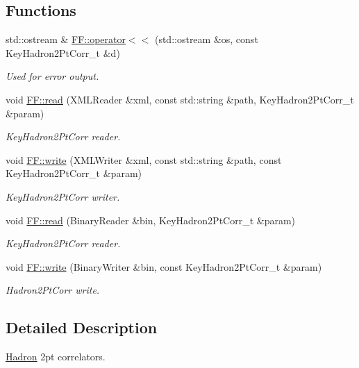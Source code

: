 \subsection*{Functions}
\begin{DoxyCompactItemize}
\item 
std\+::ostream \& \mbox{\hyperlink{namespaceFF_afe0b42b2e221ac6c88359573f349a4e7}{F\+F\+::operator$<$$<$}} (std\+::ostream \&os, const Key\+Hadron2\+Pt\+Corr\+\_\+t \&d)
\begin{DoxyCompactList}\small\item\em Used for error output. \end{DoxyCompactList}\item 
void \mbox{\hyperlink{namespaceFF_ac879699f10e046e5a2059a2efcf1408b}{F\+F\+::read}} (X\+M\+L\+Reader \&xml, const std\+::string \&path, Key\+Hadron2\+Pt\+Corr\+\_\+t \&param)
\begin{DoxyCompactList}\small\item\em Key\+Hadron2\+Pt\+Corr reader. \end{DoxyCompactList}\item 
void \mbox{\hyperlink{namespaceFF_ae24f1269c1aa6329a00ea570a38546e6}{F\+F\+::write}} (X\+M\+L\+Writer \&xml, const std\+::string \&path, const Key\+Hadron2\+Pt\+Corr\+\_\+t \&param)
\begin{DoxyCompactList}\small\item\em Key\+Hadron2\+Pt\+Corr writer. \end{DoxyCompactList}\item 
void \mbox{\hyperlink{namespaceFF_a7b6f77b4f2cff40fc56befd4b4c64b7d}{F\+F\+::read}} (Binary\+Reader \&bin, Key\+Hadron2\+Pt\+Corr\+\_\+t \&param)
\begin{DoxyCompactList}\small\item\em Key\+Hadron2\+Pt\+Corr reader. \end{DoxyCompactList}\item 
void \mbox{\hyperlink{namespaceFF_a1b83f6ebd714e1d672d8c425605ff1de}{F\+F\+::write}} (Binary\+Writer \&bin, const Key\+Hadron2\+Pt\+Corr\+\_\+t \&param)
\begin{DoxyCompactList}\small\item\em Hadron2\+Pt\+Corr write. \end{DoxyCompactList}\end{DoxyCompactItemize}


\subsection{Detailed Description}
\mbox{\hyperlink{namespaceHadron}{Hadron}} 2pt correlators. 

